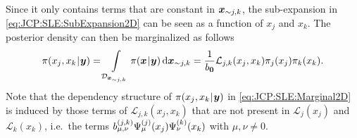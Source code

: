 Since it only contains terms that are constant in \(\bm{x}_{\sim j,k}\), the sub-expansion in \cref{eq:JCP:SLE:SubExpansion2D} can be seen as a function of \(x_j\) and \(x_k\).
The posterior density can then be marginalized as follows
\begin{equation} \label{eq:JCP:SLE:Marginal2D}
  \pi(x_j,x_k {\:\!}|{\:\!} \bm{y})
  = \int\limits_{\mathcal{D}_{\bm{x}_{\sim j,k}}} \pi(\bm{x} {\:\!}|{\:\!} \bm{y}) \, \mathrm{d} \bm{x}_{\sim j,k}
  = \frac{1}{b_{\bm{0}}} \mathcal{L}_{j,k}(x_j,x_k) \pi_j(x_j) \pi_k(x_k).
\end{equation}
Note that the dependency structure of \(\pi(x_j,x_k {\:\!}|{\:\!} \bm{y})\) in \cref{eq:JCP:SLE:Marginal2D} is induced by those terms of \(\mathcal{L}_{j,k}(x_j,x_k)\)
that are not present in \(\mathcal{L}_j(x_j)\) and \(\mathcal{L}_k(x_k)\), i.e.\ the terms \(b^{(j,k)}_{\mu,\nu} \Psi_{\mu}^{(j)}(x_j) \Psi_{\nu}^{(k)}(x_k)\) with \(\mu,\nu \neq 0\).

